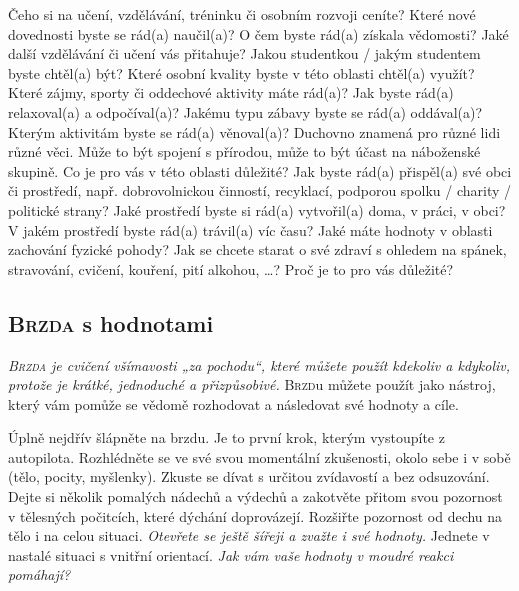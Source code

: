 			  Čeho si na učení, vzdělávání, tréninku či osobním rozvoji ceníte? Které nové dovednosti byste se rád(a) naučil(a)? O čem byste rád(a) získala vědomosti? Jaké další vzdělávání či učení vás přitahuje? Jakou studentkou / jakým studentem byste chtěl(a) být? Které osobní kvality byste v této oblasti chtěl(a) využít?
			  Které zájmy, sporty či oddechové aktivity máte rád(a)? Jak byste rád(a) relaxoval(a) a odpočíval(a)? Jakému typu zábavy byste se rád(a) oddával(a)? Kterým aktivitám byste se rád(a) věnoval(a)?
			  Duchovno znamená pro různé lidi různé věci. Může to být spojení s přírodou, může to být účast na náboženské skupině. Co je pro vás v této oblasti důležité?
			  Jak byste rád(a) přispěl(a) své obci či prostředí, např. dobrovolnickou činností, recyklací, podporou spolku / charity / politické strany? Jaké prostředí byste si rád(a) vytvořil(a) doma, v práci, v obci? V jakém prostředí byste rád(a) trávil(a) víc času?
			  Jaké máte hodnoty v oblasti zachování fyzické pohody? Jak se chcete starat o své zdraví s ohledem na spánek, stravování, cvičení, kouření, pití alkohou, …? Proč je to pro vás důležité?
		\egroup

	\clearpage
	\subsection{\textsc{Brzda} s hodnotami}
		\emph{\textup{\textsc{Brzda}} je cvičení všímavosti „za pochodu“, které můžete použít kdekoliv a kdykoliv, protože je krátké, jednoduché a přizpůsobivé.} \textup{\textsc{Brzd}}u můžete použít jako nástroj, který vám pomůže se vědomě rozhodovat a následovat své hodnoty a cíle.
		\begin{itemize}[leftmargin=10mm]
		 Úplně nejdřív šlápněte na brzdu. Je to první krok, kterým vystoupíte z autopilota.
		 Rozhlédněte se ve své svou momentální zkušenosti, okolo sebe i v sobě (tělo, pocity, myšlenky). Zkuste se dívat s určitou zvídavostí a bez odsuzování.
		 Dejte si několik pomalých nádechů a výdechů a zakotvěte přitom svou pozornost v tělesných počitcích, které dýchání doprovázejí. %
		 Rozšiřte pozornost od dechu na tělo i na celou situaci. \emph{Otevřete se ještě šířeji a zvažte i své hodnoty.}
		 Jednete v nastalé situaci s vnitřní orientací. \emph{Jak vám vaše hodnoty v moudré reakci pomáhají?}
		\end{itemize}
	\clearpage

